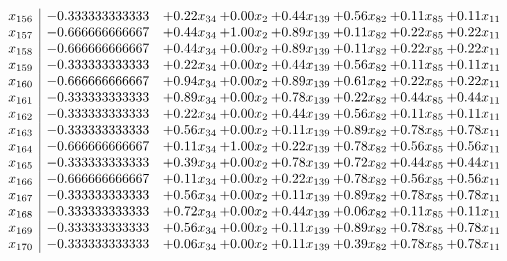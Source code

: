 \documentclass[8pt]{article}
\begin{document}
\[\begin{array}{c| c c@{\hskip 2pt} c@{\hskip 2pt} c@{\hskip 2pt} c@{\hskip 2pt} c@{\hskip 2pt} c@{\hskip 2pt} }
 x_{156}   &  -0.333333333333 & +  0.22 x_{34} & +  0.00 x_{2} & +  0.44 x_{139} & +  0.56 x_{82} & +  0.11 x_{85} & +  0.11 x_{11}\\
 x_{157}   &  -0.666666666667 & +  0.44 x_{34} & +  1.00 x_{2} & +  0.89 x_{139} & +  0.11 x_{82} & +  0.22 x_{85} & +  0.22 x_{11}\\
 x_{158}   &  -0.666666666667 & +  0.44 x_{34} & +  0.00 x_{2} & +  0.89 x_{139} & +  0.11 x_{82} & +  0.22 x_{85} & +  0.22 x_{11}\\
 x_{159}   &  -0.333333333333 & +  0.22 x_{34} & +  0.00 x_{2} & +  0.44 x_{139} & +  0.56 x_{82} & +  0.11 x_{85} & +  0.11 x_{11}\\
 x_{160}   &  -0.666666666667 & +  0.94 x_{34} & +  0.00 x_{2} & +  0.89 x_{139} & +  0.61 x_{82} & +  0.22 x_{85} & +  0.22 x_{11}\\
 x_{161}   &  -0.333333333333 & +  0.89 x_{34} & +  0.00 x_{2} & +  0.78 x_{139} & +  0.22 x_{82} & +  0.44 x_{85} & +  0.44 x_{11}\\
 x_{162}   &  -0.333333333333 & +  0.22 x_{34} & +  0.00 x_{2} & +  0.44 x_{139} & +  0.56 x_{82} & +  0.11 x_{85} & +  0.11 x_{11}\\
 x_{163}   &  -0.333333333333 & +  0.56 x_{34} & +  0.00 x_{2} & +  0.11 x_{139} & +  0.89 x_{82} & +  0.78 x_{85} & +  0.78 x_{11}\\
 x_{164}   &  -0.666666666667 & +  0.11 x_{34} & +  1.00 x_{2} & +  0.22 x_{139} & +  0.78 x_{82} & +  0.56 x_{85} & +  0.56 x_{11}\\
 x_{165}   &  -0.333333333333 & +  0.39 x_{34} & +  0.00 x_{2} & +  0.78 x_{139} & +  0.72 x_{82} & +  0.44 x_{85} & +  0.44 x_{11}\\
 x_{166}   &  -0.666666666667 & +  0.11 x_{34} & +  0.00 x_{2} & +  0.22 x_{139} & +  0.78 x_{82} & +  0.56 x_{85} & +  0.56 x_{11}\\
 x_{167}   &  -0.333333333333 & +  0.56 x_{34} & +  0.00 x_{2} & +  0.11 x_{139} & +  0.89 x_{82} & +  0.78 x_{85} & +  0.78 x_{11}\\
 x_{168}   &  -0.333333333333 & +  0.72 x_{34} & +  0.00 x_{2} & +  0.44 x_{139} & +  0.06 x_{82} & +  0.11 x_{85} & +  0.11 x_{11}\\
 x_{169}   &  -0.333333333333 & +  0.56 x_{34} & +  0.00 x_{2} & +  0.11 x_{139} & +  0.89 x_{82} & +  0.78 x_{85} & +  0.78 x_{11}\\
 x_{170}   &  -0.333333333333 & +  0.06 x_{34} & +  0.00 x_{2} & +  0.11 x_{139} & +  0.39 x_{82} & +  0.78 x_{85} & +  0.78 x_{11}\\

\end{array}\]
\end{document}
